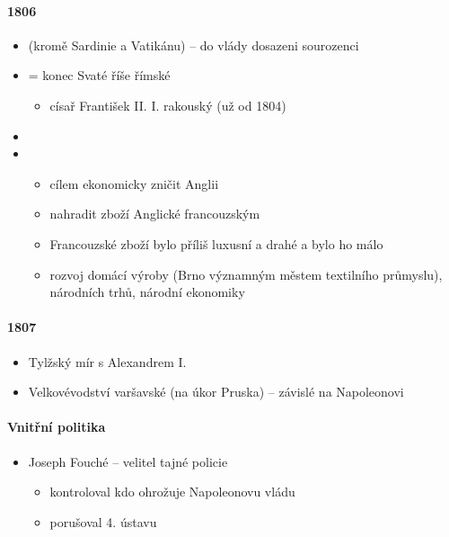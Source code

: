 \paragraph{1806}
\begin{itemize}
\item {} (kromě Sardinie a Vatikánu) -- do vlády dosazeni sourozenci
\item {} = konec Svaté říše římské
	\begin{itemize}
	\item císař František II. \ra I. rakouský (už od 1804)
	\end{itemize}
\item {}
\item {}
	\begin{itemize}
	\item cílem ekonomicky zničit Anglii 
	\item nahradit zboží Anglické francouzským
	\item Francouzské zboží bylo příliš luxusní a drahé a bylo ho málo
	\item[\ra] rozvoj domácí výroby (Brno významným městem textilního průmyslu), národních trhů, národní ekonomiky
	\end{itemize}
\end{itemize}

\paragraph{1807}
\begin{itemize}
\item Tylžský mír s Alexandrem I.
\item Velkovévodství varšavské (na úkor Pruska) -- závislé na Napoleonovi
\end{itemize}

\paragraph{Vnitřní politika}
\begin{itemize}
\item Joseph Fouché -- velitel tajné policie
	\begin{itemize}
	\item kontroloval kdo ohrožuje Napoleonovu vládu
	\item porušoval 4. ústavu
	\end{itemize}
\end{itemize}

